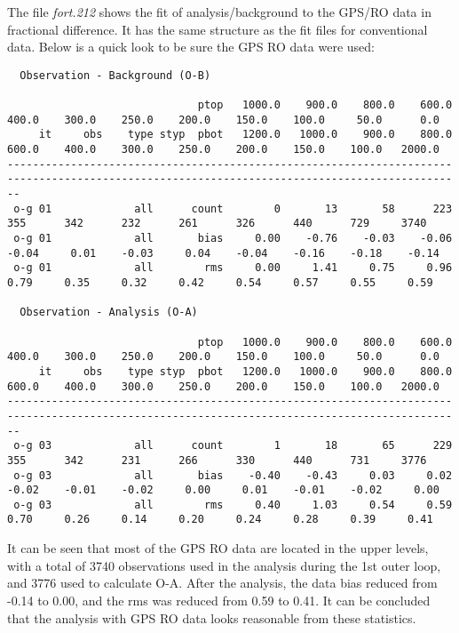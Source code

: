 The file \textit{fort.212} shows the fit of analysis/background to the GPS/RO data in fractional difference.  It has the same structure as the fit files for conventional data.  Below is a quick look to be sure the GPS RO data were used:

\begin{tiny}
\begin{verbatim}
  Observation - Background (O-B)

                              ptop   1000.0    900.0    800.0    600.0    400.0    300.0    250.0    200.0    150.0    100.0     50.0      0.0
     it     obs    type styp  pbot   1200.0   1000.0    900.0    800.0    600.0    400.0    300.0    250.0    200.0    150.0    100.0   2000.0
----------------------------------------------------------------------------------------------------------------------------------------------
 o-g 01             all      count        0       13       58      223      355      342      232      261      326      440      729     3740
 o-g 01             all       bias     0.00    -0.76    -0.03    -0.06    -0.04     0.01    -0.03     0.04    -0.04    -0.16    -0.18    -0.14
 o-g 01             all        rms     0.00     1.41     0.75     0.96     0.79     0.35     0.32     0.42     0.54     0.57     0.55     0.59

  Observation - Analysis (O-A)

                              ptop   1000.0    900.0    800.0    600.0    400.0    300.0    250.0    200.0    150.0    100.0     50.0      0.0
     it     obs    type styp  pbot   1200.0   1000.0    900.0    800.0    600.0    400.0    300.0    250.0    200.0    150.0    100.0   2000.0
----------------------------------------------------------------------------------------------------------------------------------------------
 o-g 03             all      count        1       18       65      229      355      342      231      266      330      440      731     3776
 o-g 03             all       bias    -0.40    -0.43     0.03     0.02    -0.02    -0.01    -0.02     0.00     0.01    -0.01    -0.02     0.00
 o-g 03             all        rms     0.40     1.03     0.54     0.59     0.70     0.26     0.14     0.20     0.24     0.28     0.39     0.41
\end{verbatim}
\end{tiny}

It can be seen that most of the GPS RO data are located in the upper levels, with a total of 3740 observations used in the analysis during the 1st outer loop, and 3776 used to calculate O-A. After the analysis, the data bias reduced from -0.14 to 0.00, and the rms was reduced from 0.59 to 0.41. It can be concluded that the analysis with GPS RO data looks reasonable from these statistics.  

